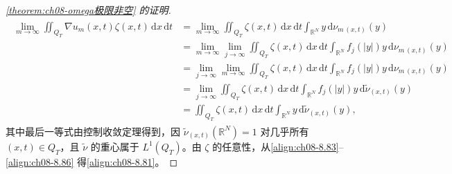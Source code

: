 \documentclass[../../main.tex]{subfiles}%
\begin{document}
\begin{proof}[\cref{theorem:ch08-omega极限非空} 的证明]
\begin{align}
\begin{aligned}
\lim_{m\to\infty}\iint_{Q_T}\nabla u_m(x,t)\zeta(x,t)\,\mathrm{d}x\,\mathrm{d}t
&=\lim_{m\to\infty}\iint_{Q_T}\zeta(x,t)\,\mathrm{d}x\,\mathrm{d}t\int_{\mathbb{R}^N}y\,\mathrm{d}\nu_{m\,(x,t)}(y)\\
&=\lim_{m\to\infty}\lim_{j\to\infty}\iint_{Q_T}\zeta(x,t)\,\mathrm{d}x\,\mathrm{d}t\int_{\mathbb{R}^N}f_j(|y|)y\,\mathrm{d}\nu_{m\,(x,t)}(y)\\
&=\lim_{j\to\infty}\lim_{m\to\infty}\iint_{Q_T}\zeta(x,t)\,\mathrm{d}x\,\mathrm{d}t\int_{\mathbb{R}^N}f_j(|y|)y\,\mathrm{d}\nu_{m\,(x,t)}(y)\\
&=\lim_{j\to\infty}\iint_{Q_T}\zeta(x,t)\,\mathrm{d}x\,\mathrm{d}t\int_{\mathbb{R}^N}f_j(|y|)y\,\mathrm{d}\tilde\nu_{(x,t)}(y)\\
&=\iint_{Q_T}\zeta(x,t)\,\mathrm{d}x\,\mathrm{d}t\int_{\mathbb{R}^N}y\,\mathrm{d}\tilde\nu_{(x,t)}(y),
\end{aligned} \label{align:ch08-8.86}
\end{align}
其中最后一等式由控制收敛定理得到，因 $\tilde\nu_{(x,t)}(\mathbb{R}^N)=1$ 对几乎所有 $(x,t)\in Q_T$，且 $\tilde\nu$ 的重心属于 $L^1(Q_T)$。由 $\zeta$ 的任意性，从\eqref{align:ch08-8.83}--\eqref{align:ch08-8.86} 得\eqref{align:ch08-8.81}。


\end{proof}
\end{document}
